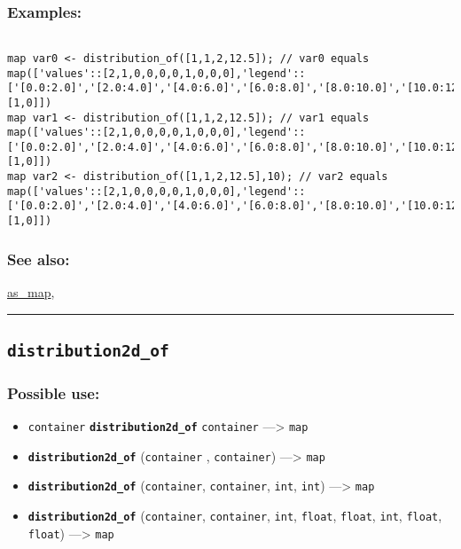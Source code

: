 \documentclass[]{book}
\providecommand{\tightlist}{%
  \setlength{\itemsep}{0pt}\setlength{\parskip}{0pt}}
\theoremstyle{definition}
\theoremstyle{definition}
\theoremstyle{definition}
\theoremstyle{remark}
\begin{document}
\subsubsection{Examples:}\label{examples-105}

\begin{verbatim}
 
map var0 <- distribution_of([1,1,2,12.5]); // var0 equals map(['values'::[2,1,0,0,0,0,1,0,0,0],'legend'::['[0.0:2.0]','[2.0:4.0]','[4.0:6.0]','[6.0:8.0]','[8.0:10.0]','[10.0:12.0]','[12.0:14.0]','[14.0:16.0]','[16.0:18.0]','[18.0:20.0]'],'parlist'::[1,0]]) 
map var1 <- distribution_of([1,1,2,12.5]); // var1 equals map(['values'::[2,1,0,0,0,0,1,0,0,0],'legend'::['[0.0:2.0]','[2.0:4.0]','[4.0:6.0]','[6.0:8.0]','[8.0:10.0]','[10.0:12.0]','[12.0:14.0]','[14.0:16.0]','[16.0:18.0]','[18.0:20.0]'],'parlist'::[1,0]]) 
map var2 <- distribution_of([1,1,2,12.5],10); // var2 equals map(['values'::[2,1,0,0,0,0,1,0,0,0],'legend'::['[0.0:2.0]','[2.0:4.0]','[4.0:6.0]','[6.0:8.0]','[8.0:10.0]','[10.0:12.0]','[12.0:14.0]','[14.0:16.0]','[16.0:18.0]','[18.0:20.0]'],'parlist'::[1,0]])
\end{verbatim}

\subsubsection{See also:}\label{see-also-82}

\href{OperatorsAA\#as_map}{as\_map},

\begin{center}\rule{0.5\linewidth}{\linethickness}\end{center}

\subsection{\texorpdfstring{\texttt{distribution2d\_of}}{distribution2d\_of}}\label{distribution2d_of}

\subsubsection{Possible use:}\label{possible-use-139}

\begin{itemize}
\tightlist
\item
  \texttt{container} \textbf{\texttt{distribution2d\_of}}
  \texttt{container} ---\textgreater{} \texttt{map}
\item
  \textbf{\texttt{distribution2d\_of}} (\texttt{container} ,
  \texttt{container}) ---\textgreater{} \texttt{map}
\item
  \textbf{\texttt{distribution2d\_of}} (\texttt{container},
  \texttt{container}, \texttt{int}, \texttt{int}) ---\textgreater{}
  \texttt{map}
\item
  \textbf{\texttt{distribution2d\_of}} (\texttt{container},
  \texttt{container}, \texttt{int}, \texttt{float}, \texttt{float},
  \texttt{int}, \texttt{float}, \texttt{float}) ---\textgreater{}
  \texttt{map}
\end{itemize}
\end{document}
